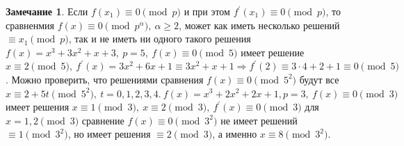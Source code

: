 \documentclass[a4paper, 12pt]{article}
\theoremstyle{definition}
\newtheorem*{comm}{Замечание}
\begin{document}
    \begin{comm}
        Если $f(x_1)\equiv 0\pmod{p}$ и при этом $f^{\prime}(x_1)\equiv 0\pmod{p}$, то сравненмия $f(x)\equiv 0\pmod{p^{\alpha}},\ \alpha\geq 2$, может как иметь несколько решений $\equiv x_1\pmod{p}$, так и не иметь ни одного такого решения $f(x)=x^3+3x^2+x+3,\ p=5,\ f(x)\equiv 0\pmod{5}$ имеет решение $x\equiv 2\pmod{5},\ f^{\prime}(x)=3x^2+6x+1\equiv 3x^2+x+1 \Rightarrow f^{\prime}(2)\equiv 3\cdot 4+2+1\equiv 0\pmod{5}$. Можно проверить, что решениями сравнения $f(x)\equiv 0\pmod{5^2}$ будут все $x\equiv 2+5t\pmod{5^2},\ t=0,1,2,3,4.\ f(x)=x^3+2x^2+2x+1, p=3,\ f(x)\equiv 0\pmod{3}$ имеет решения $x\equiv 1\pmod{3},\ x\equiv 2\pmod{3},\ f^{\prime}(x)\equiv 0\pmod{3}$ для $x=1,2\pmod{3}$ сравнение $f(x)\equiv 0\pmod{3^2}$ не имеет решений $\equiv 1\pmod{3^2}$, но имеет решения $\equiv 2\pmod{3}$, а именно $x\equiv 8\pmod{3^2}$. 
    \end{comm} 
\end{document}
